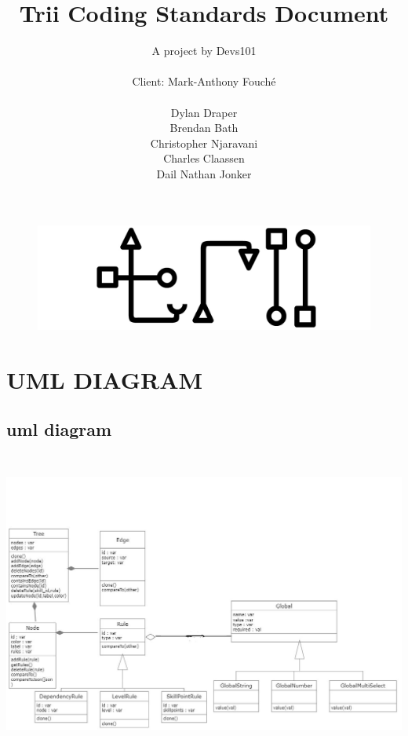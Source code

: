 \documentclass[12pt]{article}
\begin{document}
\title{Trii Coding Standards Document}
\author{A project by Devs101\\ \\
Client: Mark-Anthony Fouché\\ \\
Dylan Draper\\
Brendan Bath\\
Christopher Njaravani\\
Charles Claassen\\
Dail Nathan Jonker\\
}
\maketitle




\begin{figure}
	\includegraphics[width=\linewidth]{images/logo.jpg}
	\label{fig:logo}
\end{figure}
\newpage
{}

\tableofcontents
\newpage

 \section{UML DIAGRAM }
 \subsection{uml diagram}
 \includegraphics[width=15cm, height=10cm]{images/umldiagram.jpg} 
\end{document}
